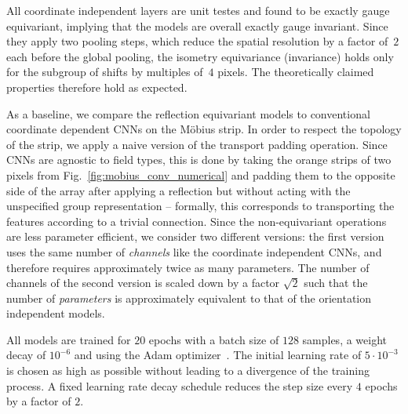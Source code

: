 All coordinate independent layers are unit testes and found to be exactly gauge equivariant, implying that the models are overall exactly gauge invariant.
Since they apply two pooling steps, which reduce the spatial resolution by a factor of~$2$ each before the global pooling, the isometry equivariance (invariance) holds only for the subgroup of shifts by multiples of~$4$ pixels.
The theoretically claimed properties therefore hold as expected.

As a baseline, we compare the reflection equivariant models to conventional coordinate dependent CNNs on the M\"obius strip.
In order to respect the topology of the strip, we apply a naive version of the transport padding operation.
Since CNNs are agnostic to field types, this is done by taking the orange strips of two pixels from Fig.~\ref{fig:mobius_conv_numerical} and padding them to the opposite side of the array after applying a reflection but without acting with the unspecified group representation -- formally, this corresponds to transporting the features according to a trivial connection.
Since the non-equivariant operations are less parameter efficient, we consider two different versions:
the first version uses the same number of \emph{channels} like the coordinate independent CNNs, and therefore requires approximately twice as many parameters.
The number of channels of the second version is scaled down by a factor $\sqrt{2}$ such that the number of \emph{parameters} is approximately equivalent to that of the orientation independent models.

All models are trained for $20$ epochs with a batch size of $128$ samples, a weight decay of $10^{-6}$ and using the Adam optimizer~\cite{Kingma2015-yq}.
The initial learning rate of $5\cdot10^{-3}$ is chosen as high as possible without leading to a divergence of the training process.
A fixed learning rate decay schedule reduces the step size every $4$ epochs by a factor of $2$.

